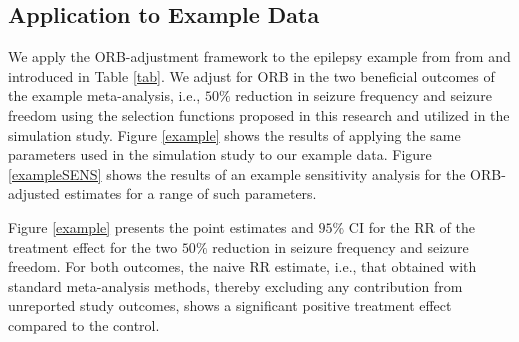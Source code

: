 \documentclass[twocolumn]{article}\usepackage[]{graphicx}\usepackage[]{xcolor}
\begin{document}

\subsection{Application to Example Data} \label{3.3}

We apply the ORB-adjustment framework to the epilepsy example from from \citet{topiramate} and \citet{Copas2019} introduced in Table \ref{tab}. We adjust for ORB in the two beneficial outcomes of the example meta-analysis, i.e.,  $50\%$ reduction in seizure frequency and seizure freedom using the selection functions proposed in this research and utilized in the simulation study. Figure \ref{example} shows the results of applying the same parameters used in the simulation study to our example data.  Figure \ref{exampleSENS} shows the results of an example sensitivity analysis for the ORB-adjusted estimates for a range of such parameters. %

Figure \ref{example} presents the point estimates and $95\%$ CI for the RR of the treatment effect for the two $50\%$ reduction in seizure frequency and seizure freedom. For both outcomes, the naive RR estimate, i.e., that obtained with standard meta-analysis methods, thereby excluding any contribution from unreported study outcomes, shows a significant positive treatment effect compared to the control.
\end{document}
